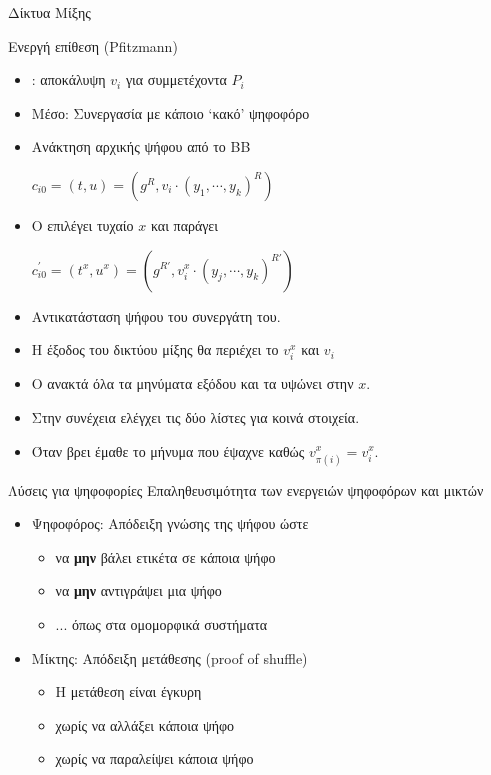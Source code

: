 \documentclass[handout]{beamer}
\begin{document}
\begin{section}{Δίκτυα Μίξης}
\begin{frame}{Ενεργή επίθεση (Pfitzmann)}
    \begin{itemize}
\item {} \adv: αποκάλυψη $v_i$ για συμμετέχοντα $P_i$ \pause  
\item \alert{Μέσο}: Συνεργασία με κάποιο `κακό' ψηφοφόρο \pause 
\item Ανάκτηση αρχικής ψήφου από το ΒΒ  \pause 
\begin{center}
$c_{i0} =  (t,u) = (g^R, v_i \cdot (y_1,\cdots,y_k)^R) $ 
\end{center}
\item Ο  \adv επιλέγει τυχαίο $x$ και παράγει \pause 
\begin{center}
$c^{'}_{i0} = (t^x,u^x)=( g^{R'}, v_{i}^{x} \cdot (y_j,\cdots,y_k)^{R'} )$ 
\end{center}
\item Αντικατάσταση ψήφου του συνεργάτη του. \pause 
\item Η έξοδος του δικτύου μίξης θα περιέχει  το $v_{i}^{x}$  και $v_{i}$ \pause 
\item Ο \adv ανακτά όλα τα μηνύματα εξόδου και τα υψώνει στην $x$. \pause 
\item Στην συνέχεια ελέγχει τις δύο λίστες για κοινά στοιχεία. \pause 
\item Όταν βρει έμαθε το μήνυμα που έψαχνε καθώς $v_{\pi(i)}^x = v_i^x$. 
\end{itemize}
\end{frame}

\begin{frame}{Λύσεις για ψηφοφορίες}
Επαληθευσιμότητα των ενεργειών ψηφοφόρων και μικτών \pause 
\begin{itemize}
  \item Ψηφοφόρος: Απόδειξη γνώσης της ψήφου ώστε 
  \begin{itemize}
   \item να \textbf{μην} βάλει ετικέτα σε κάποια ψήφο
   \item να \textbf{μην}  αντιγράψει μια ψήφο
   \item ... όπως στα ομομορφικά συστήματα
  \end{itemize}    \pause  
  \item Μίκτης: Απόδειξη μετάθεσης (proof of shuffle)
  \begin{itemize}
   \item Η μετάθεση είναι έγκυρη
   \item χωρίς να αλλάξει κάποια ψήφο
   \item χωρίς να παραλείψει κάποια ψήφο 
  \end{itemize}
\end{itemize}
\end{frame}
 

\end{section}
\end{document}
